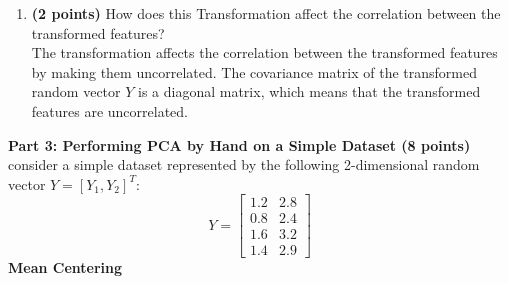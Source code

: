 \documentclass[a3paper,12pt]{extarticle} %
\begin{document}
\begin{enumerate}
\begin{enumerate}
\[    \Sigma_Y = \begin{bmatrix}0.78907948 & 0.16466637 & 0.52644338 & 0.27036259\\0.16328172 & -0.98478572 & 0.05882726 & 0.00869061\\0.28804636 & 0.04206535 & 0.04585165 & -0.95559271\\0.51741855 & 0.03622962 & -0.84693231 & 0.11692356\end{bmatrix} \begin{bmatrix}5 & 1.2 & 0.8 & 0.6\\1.2 & 4 & 0.5 & 0.3\\0.8 & 0.5 & 3 & 0.2\\0.6 & 0.3 & 0.2 & 2\end{bmatrix} \begin{bmatrix}0.78907948 & 0.16328172 & 0.52644338 & 0.27036259\\0.16466637 & -0.98478572 & 0.05882726 & 0.00869061\\0.52644338 & 0.05882726 & 0.04585165 & -0.84693231\\0.27036259 & 0.00869061 & -0.95559271 & 0.11692356\end{bmatrix}
    \]
    \[
    \Sigma_Y = \begin{bmatrix}6.20306 & 0 & 0 & 0\\0 & 3.20619 & 0 & 0\\0 & 0 & 2.71066 & 0\\0 & 0 & 0 & 1.88009\end{bmatrix}
    \]
    \item \textbf{(2 points)} How does this Transformation affect the correlation between the transformed features?
    \\ The transformation affects the correlation between the transformed features by making them uncorrelated. The covariance matrix of the transformed random vector \(Y\) is a diagonal matrix, which means that the transformed features are uncorrelated.
    \end{enumerate}
    \subitem \textbf{Part 3: Performing PCA by Hand on a Simple Dataset (8 points)}
    consider a simple dataset represented by the following 2-dimensional random vector \(Y = [Y_1, Y_2]^{T}\):
    \[
    Y = \begin{bmatrix}1.2 & 2.8\\0.8 & 2.4\\1.6 & 3.2\\1.4 & 2.9\end{bmatrix}
    \]
    \subitem \textbf{Mean Centering}
    \begin{enumerate}

\end{enumerate}
\end{enumerate}
\end{document}
